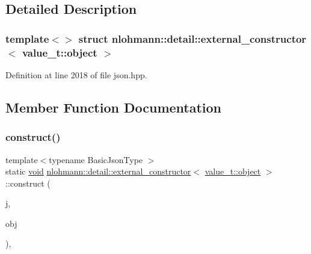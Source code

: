 \subsection{Detailed Description}
\subsubsection*{template$<$$>$\newline
struct nlohmann\+::detail\+::external\+\_\+constructor$<$ value\+\_\+t\+::object $>$}



Definition at line 2018 of file json.\+hpp.



\subsection{Member Function Documentation}
\mbox{\label{structnlohmann_1_1detail_1_1external__constructor_3_01value__t_1_1object_01_4_a3a369c5d49596dd4411e368425f9ac7a}} 
\subsubsection{\texorpdfstring{construct()}{construct()}\hspace{0.1cm}{\footnotesize\ttfamily [1/3]}}
{\footnotesize\ttfamily template$<$typename Basic\+Json\+Type $>$ \\
static \mbox{\hyperlink{namespacenlohmann_1_1detail_a59fca69799f6b9e366710cb9043aa77d}{void}} \mbox{\hyperlink{structnlohmann_1_1detail_1_1external__constructor}{nlohmann\+::detail\+::external\+\_\+constructor}}$<$ \mbox{\hyperlink{namespacenlohmann_1_1detail_a1ed8fc6239da25abcaf681d30ace4985aa8cfde6331bd59eb2ac96f8911c4b666}{value\+\_\+t\+::object}} $>$\+::construct (\begin{DoxyParamCaption}\item[{Basic\+Json\+Type \&}]{j,  }\item[{const typename Basic\+Json\+Type\+::object\+\_\+t \&}]{obj }\end{DoxyParamCaption})\hspace{0.3cm}{\ttfamily [inline]}, {\ttfamily [static]}}



